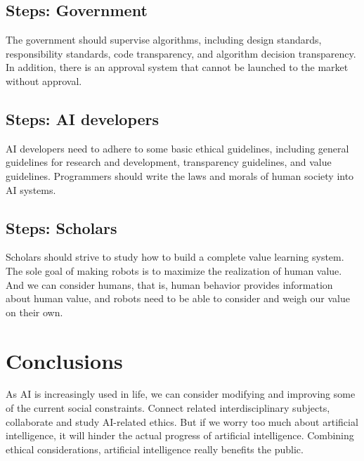 \documentclass[12pt]{article}  %
\begin{document}
\subsection{Steps: Government}
	The government should supervise algorithms, including design standards, responsibility standards, code transparency, and algorithm decision transparency. In addition, there is an approval system that cannot be launched to the market without approval.
\subsection{Steps: AI developers}
	AI developers need to adhere to some basic ethical guidelines, including general guidelines for research and development, transparency guidelines, and value guidelines. Programmers should write the laws and morals of human society into AI systems.
\subsection{Steps: Scholars}
	Scholars should strive to study how to build a complete value learning system. The sole goal of making robots is to maximize the realization of human value. And we can consider humans, that is, human behavior provides information about human value, and robots need to be able to consider and weigh our value on their own.
\section{Conclusions}
	As AI is increasingly used in life, we can consider modifying and improving some of the current social constraints. Connect related interdisciplinary subjects, collaborate and study AI-related ethics. But if we worry too much about artificial intelligence, it will hinder the actual progress of artificial intelligence. Combining ethical considerations, artificial intelligence really benefits the public.
\printbibliography
\end{document}
